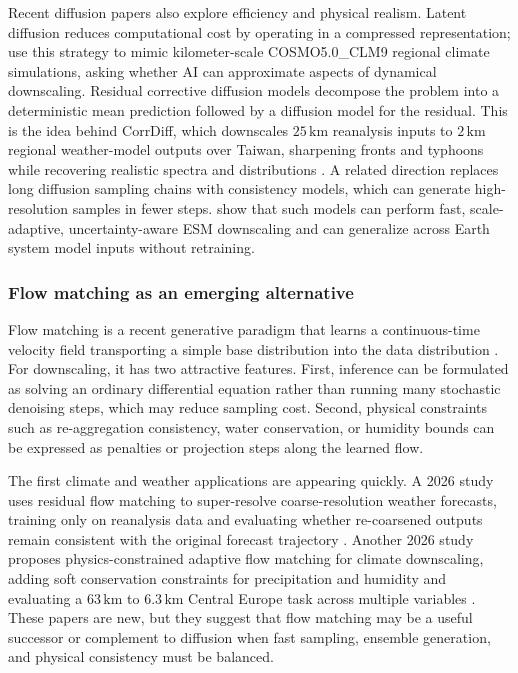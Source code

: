 \documentclass[a4paper,12pt,leqno]{article}
\begin{document}
Recent diffusion papers also explore efficiency and physical realism.
Latent diffusion reduces computational cost by operating in a compressed
representation; \textcite{tomasi2025latent_diffusion_downscaling} use
this strategy to mimic kilometer-scale COSMO5.0\_CLM9 regional climate
simulations, asking whether AI can approximate aspects of dynamical
downscaling. Residual corrective diffusion models decompose the problem
into a deterministic mean prediction followed by a diffusion model for
the residual. This is the idea behind CorrDiff, which downscales
\(25\,\mathrm{km}\) reanalysis inputs to \(2\,\mathrm{km}\) regional
weather-model outputs over Taiwan, sharpening fronts and typhoons while
recovering realistic spectra and distributions
\parencite{mardani2025corrdiff}. A related direction replaces long
diffusion sampling chains with consistency models, which can generate
high-resolution samples in fewer steps. \textcite{hess2025consistency_downscaling}
show that such models can perform fast, scale-adaptive, uncertainty-aware
ESM downscaling and can generalize across Earth system model inputs
without retraining.

\subsubsection{Flow matching as an emerging alternative}

Flow matching is a recent generative paradigm that learns a
continuous-time velocity field transporting a simple base distribution
into the data distribution \parencite{lipman2023flow_matching}. For
downscaling, it has two attractive features. First, inference can be
formulated as solving an ordinary differential equation rather than
running many stochastic denoising steps, which may reduce sampling cost.
Second, physical constraints such as re-aggregation consistency, water
conservation, or humidity bounds can be expressed as penalties or
projection steps along the learned flow.

The first climate and weather applications are appearing quickly. A 2026
study uses residual flow matching to super-resolve coarse-resolution
weather forecasts, training only on reanalysis data and evaluating
whether re-coarsened outputs remain consistent with the original forecast
trajectory \parencite{delefosse2026flow_matching_weather}. Another 2026
study proposes physics-constrained adaptive flow matching for climate
downscaling, adding soft conservation constraints for precipitation and
humidity and evaluating a \(63\,\mathrm{km}\) to \(6.3\,\mathrm{km}\)
Central Europe task across multiple variables
\parencite{debeire2026physics_constrained_flow_matching}. These papers are
new, but they suggest that flow matching may be a useful successor or
complement to diffusion when fast sampling, ensemble generation, and
physical consistency must be balanced.
\end{document}
